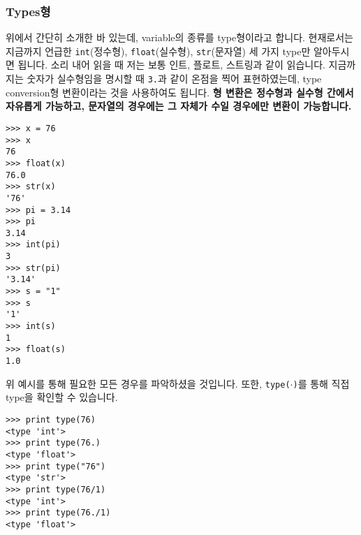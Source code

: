 \documentclass[../main.tex]{subfiles}
\begin{document}
\subsubsection{Types형}
위에서 간단히 소개한 바 있는데, variable의 종류를 type형이라고 합니다.
현재로서는 지금까지 언급한 \texttt{int}(정수형), \texttt{float}(실수형), \texttt{str}(문자열) 세 가지 type만 알아두시면 됩니다.
소리 내어 읽을 때 저는 보통 인트, 플로트, 스트링과 같이 읽습니다.
지금까지는 숫자가 실수형임을 명시할 때 \texttt{3.}과 같이 온점을 찍어 표현하였는데, type conversion형 변환이라는 것을 사용하여도 됩니다.
\textbf{형 변환은 정수형과 실수형 간에서 자유롭게 가능하고, 문자열의 경우에는 그 자체가 수일 경우에만 변환이 가능합니다.}
\begin{verbatim}
>>> x = 76
>>> x
76
>>> float(x)
76.0
>>> str(x)
'76'
>>> pi = 3.14
>>> pi
3.14
>>> int(pi)
3
>>> str(pi)
'3.14'
>>> s = "1"
>>> s
'1'
>>> int(s)
1
>>> float(s)
1.0
\end{verbatim}
위 예시를 통해 필요한 모든 경우를 파악하셨을 것입니다.
또한, \texttt{type($\cdot$)}를 통해 직접 type을 확인할 수 있습니다.
\begin{verbatim}
>>> print type(76)
<type 'int'>
>>> print type(76.)
<type 'float'>
>>> print type("76")
<type 'str'>
>>> print type(76/1)
<type 'int'>
>>> print type(76./1)
<type 'float'>
\end{verbatim}
\end{document}
